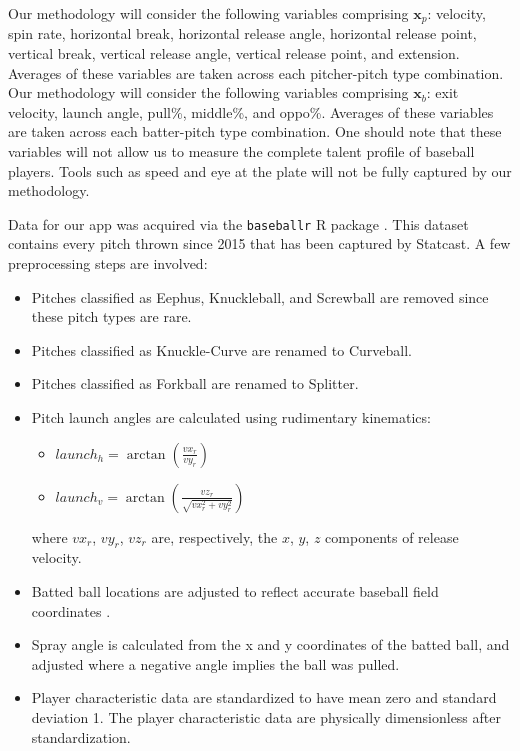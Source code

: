 \documentclass[12pt]{article}
\newcommand{\x}{\textbf{x}}
\begin{document}
Our methodology will consider the following variables comprising $\x_p$: velocity, spin rate, horizontal break, horizontal release angle, horizontal release point, vertical break, vertical release angle, vertical release point, and extension. Averages of these variables are taken across each pitcher-pitch type combination. Our methodology will consider the following variables comprising $\x_b$: exit velocity, launch angle, pull\%, middle\%, and oppo\%. Averages of these variables are taken across each batter-pitch type combination. One should note that these variables will not allow us to measure the complete talent profile of baseball players. %
Tools such as speed and eye at the plate will not be fully captured by our methodology.

Data for our app was acquired via the \texttt{baseballr} R package \citep{baseballr}. This dataset contains every pitch thrown since 2015 that has been captured by Statcast. A few preprocessing steps are involved:
\begin{itemize}
    \item Pitches classified as Eephus, Knuckleball, and Screwball are removed since these pitch types are rare.
    \item Pitches classified as Knuckle-Curve are renamed to Curveball.
    \item Pitches classified as Forkball are renamed to Splitter.
    \item Pitch launch angles are calculated using rudimentary kinematics:
        \begin{itemize}
            \item $launch_h = \arctan(\frac{vx_r}{vy_r})$
            \item $launch_v = \arctan\left(\frac{vz_r}{\sqrt{vx_r^2 + vy_r^2}}\right)$
        \end{itemize}
        where $vx_r$, $vy_r$, $vz_r$ are, respectively, the $x$, $y$, $z$ components of release velocity.
    \item Batted ball locations are adjusted to reflect accurate baseball field coordinates \citep{petti2017research}.
    \item Spray angle is calculated from the x and y coordinates of the batted ball, and adjusted where a negative angle implies the ball was pulled.
    \item Player characteristic data are standardized to have mean zero and standard deviation 1. The player characteristic data are physically dimensionless after standardization. 
\end{itemize}
\end{document}
